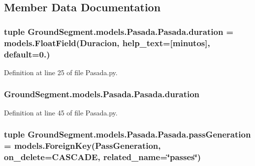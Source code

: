 \subsection{Member Data Documentation}
\hypertarget{class_ground_segment_1_1models_1_1_pasada_1_1_pasada_a154b43edff06093efdad607f99414b49}{}
\subsubsection[{duration}]{\setlength{\rightskip}{0pt plus 5cm}tuple Ground\+Segment.\+models.\+Pasada.\+Pasada.\+duration = models.\+Float\+Field(\textquotesingle{}Duracion\textquotesingle{}, help\+\_\+text=\textquotesingle{}\mbox{[}minutos\mbox{]}\textquotesingle{}, default=0.)\hspace{0.3cm}{\ttfamily [static]}}\label{class_ground_segment_1_1models_1_1_pasada_1_1_pasada_a154b43edff06093efdad607f99414b49}


Definition at line 25 of file Pasada.\+py.

\hypertarget{class_ground_segment_1_1models_1_1_pasada_1_1_pasada_abeb6ca27acba910e5302a04ff09f70fd}{}
\subsubsection[{duration}]{\setlength{\rightskip}{0pt plus 5cm}Ground\+Segment.\+models.\+Pasada.\+Pasada.\+duration}\label{class_ground_segment_1_1models_1_1_pasada_1_1_pasada_abeb6ca27acba910e5302a04ff09f70fd}


Definition at line 45 of file Pasada.\+py.

\hypertarget{class_ground_segment_1_1models_1_1_pasada_1_1_pasada_af4b9bd78031aee8d8a615e00e6e45e3e}{}
\subsubsection[{pass\+Generation}]{\setlength{\rightskip}{0pt plus 5cm}tuple Ground\+Segment.\+models.\+Pasada.\+Pasada.\+pass\+Generation = models.\+Foreign\+Key({\bf Pass\+Generation}, on\+\_\+delete=C\+A\+S\+C\+A\+D\+E, related\+\_\+name=\char`\"{}passes\char`\"{})\hspace{0.3cm}{\ttfamily [static]}}\label{class_ground_segment_1_1models_1_1_pasada_1_1_pasada_af4b9bd78031aee8d8a615e00e6e45e3e}


